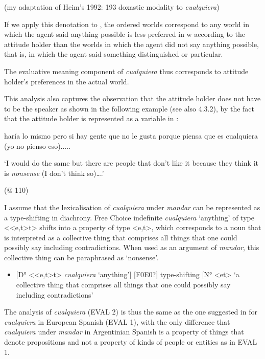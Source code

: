 \documentclass[output=paper]{langscibook}
\begin{document}
    (my adaptation of Heim’s 1992: 193 doxastic modality to \textit{cualquiera})

If we apply this denotation to , the ordered worlds correspond to any world in which the agent said anything possible is less preferred in w according to the attitude holder than the worlds in which the agent did not say anything possible, that is, in which the agent said something distinguished or particular.

  The evaluative meaning component of \textit{cualquiera} thus corresponds to attitude holder’s preferences in the actual world.

  This analysis also captures the observation that the attitude holder does not have to be the speaker as shown in the following example (see also 4.3.2), by the fact that the attitude holder is represented as a variable in :

    haría lo mismo pero si hay gente que no le gusta porque piensa que es cualquiera (yo no pienso eso).....

    ‘I would do the same but there are people that don’t like it because they think it is \textit{nonsense} (I don’t think so)….’

    (@ 110)

I assume that the lexicalisation of \textit{cualquiera} under \textit{mandar} can be represented as a type-shifting in diachrony. Free Choice indefinite \textit{cualquiera} ‘anything’ of type <<e,t>t> shifts into a property of type <e,t>, which corresponds to a noun that is interpreted as a collective thing that comprises all things that one could possibly say including contradictions. When used as an argument of \textit{mandar}, this collective thing can be paraphrased as ‘nonsense’.

\begin{itemize}
\item \begin{styleListParagraph}
\textmd{[D° <<e,t>t>} \textmd{\textit{cualquiera}}\textmd{ ‘anything’] [F0E0?] type-shifting [N° <et> ‘a collective thing that comprises all things that one could possibly say including contradictions’}
\end{styleListParagraph}
\end{itemize}

The analysis of \textit{cualquiera} (EVAL 2) is thus the same as the one suggested in  for \textit{cualquiera} in European Spanish (EVAL 1), with the only difference that \textit{cualquiera} under \textit{mandar} in Argentinian Spanish is a property of things that denote propositions and not a property of kinds of people or entities as in EVAL 1.  
\end{document}
